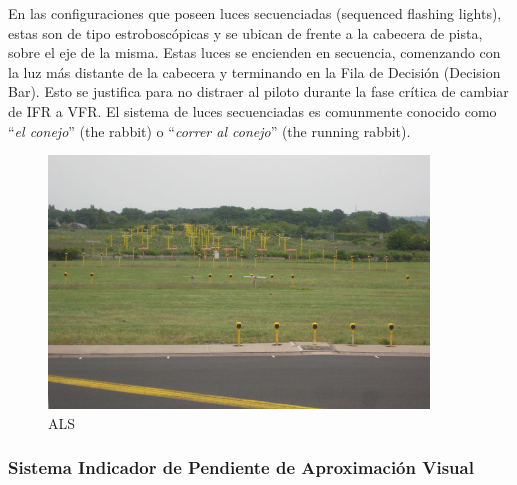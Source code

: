 En las configuraciones que poseen luces secuenciadas (sequenced flashing lights), estas son de tipo
estroboscópicas y se ubican de frente a la cabecera de pista, sobre el eje de la misma. Estas luces
se encienden en secuencia, comenzando con la luz más distante de la cabecera y terminando en la
Fila de Decisión (Decision Bar). Esto se justifica para no distraer al piloto durante la fase crítica de cambiar de IFR a VFR. El sistema de luces secuenciadas es comunmente conocido como ``\emph{el conejo}'' (the rabbit) o ``\emph{correr al conejo}'' (the running rabbit).

\begin{figure}[!htb]
  \centering
  \includegraphics[width=0.9\textwidth]{06.radionavegacion/Imagenes/06.ALS/ALS-01.jpg} 
  \caption{ALS \protect\cite{ALSfoto}}
  \label{fig:06.ALS.aeropuerto}
\end{figure}



\subsubsection{Sistema  Indicador de Pendiente de Aproximación Visual }
\label{sec:06.02.02.VASIS}


